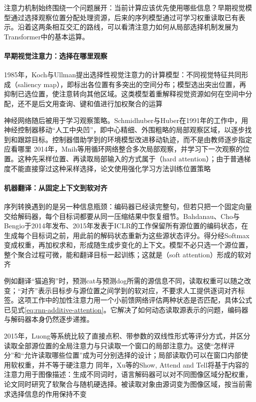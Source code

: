 注意力机制始终围绕一个问题展开：当前计算应该优先使用哪些信息？早期视觉模型通过选择观察位置分配处理资源，后来的序列模型通过可学习权重读取已有表示。沿着这两条相互交汇的路线，可以看清注意力如何从局部选择机制发展为Transformer中的基本运算。

\paragraph{早期视觉注意力：选择在哪里观察}
1985年，Koch与Ullman提出选择性视觉注意力的计算模型：不同视觉特征共同形成（saliency map），即标出各位置有多突出的空间分布；模型选出突出位置，再抑制已选位置，使注意转向其他区域。这类模型着重解释视觉资源如何在空间中分配，还不是后文用查询、键和值进行加权聚合的运算

神经网络随后被用于学习观察策略。Schmidhuber与Huber在1991年的工作中，用神经控制器移动“人工中央凹”，即中心精细、外围粗略的局部观察区域，以逐步找到和跟踪目标。控制器借助学到的环境模型改进移动轨迹，而不是由教师逐步指定应看哪里 2014年，Mnih等用循环网络整合多次局部观察，并学习下一次观察的位置。这种先采样位置、再读取局部输入的方式属于（hard attention）；由于普通梯度不能直接穿过这种采样选择，论文使用强化学习方法训练位置策略

\paragraph{机器翻译：从固定上下文到软对齐}
序列转换遇到的是另一种信息瓶颈：编码器已经读完整句，但若只把一个固定向量交给解码器，每个目标词都要从同一压缩结果中恢复细节。Bahdanau、Cho与Bengio于2014年发布、2015年发表于ICLR的工作保留所有源位置的编码状态，在生成每个目标词之前，用此前的解码状态重新为这些源状态评分。得分经Softmax变成权重，再加权求和，形成随生成步变化的上下文。模型不必只选一个源位置，整个聚合过程可微，能和翻译目标一起训练；这就是（soft attention）形成的软对齐

例如翻译“猫追狗”时，预测cat与预测dog所需的源信息不同，读取权重可以随之改变；“对齐”表示目标步与源位置之间学到的软对应，不要求人工提供逐词对齐标签。这项工作中的加性注意力用一个小前馈网络评估两种状态是否匹配，具体公式已见式\eqref{eq:rnn-additive-attention}。它解决了如何动态读取源表示的问题，编码器与解码器本身仍然逐步递推。

2015年，Luong等系统比较了直接点积、带参数的双线性形式等评分方式，并区分读取全部源位置的全局注意力与只读取一个窗口的局部注意力。这使“怎样评分”和“允许读取哪些位置”成为可分别选择的设计；局部读取仍可以在窗口内部使用软权重，并不等于硬注意力 同年，Xu等的Show, Attend and Tell将基于内容的注意力用于图像描述：生成不同词时，语言解码器可以对不同图像区域分配权重，论文同时研究了软聚合与随机硬选择。被读取对象由源词变为图像区域，按当前需求选择信息的作用保持不变

